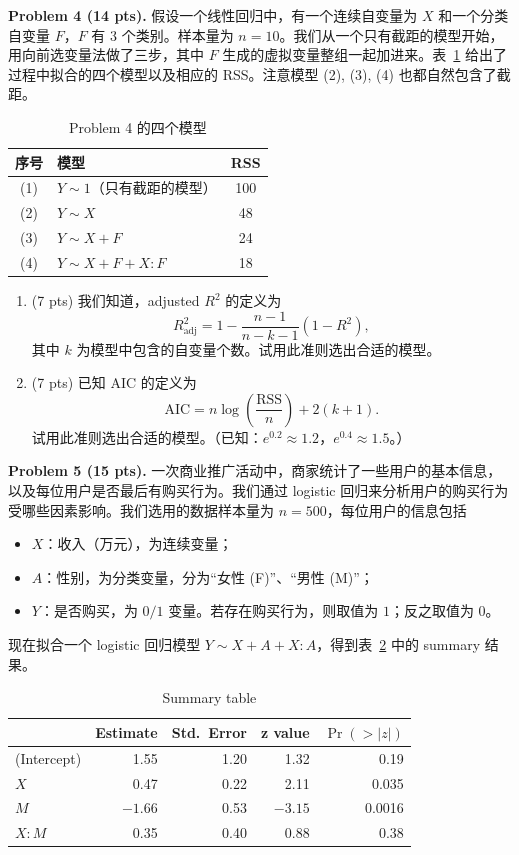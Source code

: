 \documentclass[11pt]{ctexart}
\begin{document}
\noindent\textbf{Problem 4 (14 pts).} 假设一个线性回归中，有一个连续自变量为 $X$ 和一个分类自变量 $F$，$F$ 有 $3$ 个类别。样本量为 $n = 10$。我们从一个只有截距的模型开始，用向前选变量法做了三步，其中 $F$ 生成的虚拟变量整组一起加进来。表~\ref{tab:mt1p4} 给出了过程中拟合的四个模型以及相应的 RSS。注意模型 (2), (3), (4) 也都自然包含了截距。

\begin{table}[h]
\centering
\caption{Problem 4 的四个模型}
\label{tab:mt1p4}
\begin{tabular}{clc}
\toprule
序号 & 模型 & RSS \\
\midrule
(1) & $Y \sim 1$（只有截距的模型） & 100 \\
(2) & $Y \sim X$ & 48 \\
(3) & $Y \sim X + F$ & 24 \\
(4) & $Y \sim X + F + X : F$ & 18 \\
\bottomrule
\end{tabular}
\end{table}

\begin{enumerate}
\item (7 pts) 我们知道，adjusted $R^2$ 的定义为
\[
R^2_{\mathrm{adj}} = 1 - \frac{n-1}{n-k-1}\left(1 - R^2\right),
\]
其中 $k$ 为模型中包含的自变量个数。试用此准则选出合适的模型。
\item (7 pts) 已知 AIC 的定义为
\[
\mathrm{AIC} = n \log\left(\frac{\mathrm{RSS}}{n}\right) + 2(k+1).
\]
试用此准则选出合适的模型。（已知：$e^{0.2} \approx 1.2$，$e^{0.4} \approx 1.5$。）
\end{enumerate}

\noindent\textbf{Problem 5 (15 pts).} 一次商业推广活动中，商家统计了一些用户的基本信息，以及每位用户是否最后有购买行为。我们通过 logistic 回归来分析用户的购买行为受哪些因素影响。我们选用的数据样本量为 $n = 500$，每位用户的信息包括
\begin{itemize}
\item $X$：收入（万元），为连续变量；
\item $A$：性别，为分类变量，分为“女性 (F)”、“男性 (M)”；
\item $Y$：是否购买，为 $0/1$ 变量。若存在购买行为，则取值为 $1$；反之取值为 $0$。
\end{itemize}
现在拟合一个 logistic 回归模型 $Y \sim X + A + X : A$，得到表~\ref{tab:mt1p5} 中的 summary 结果。

\begin{table}[h]
\centering
\caption{Summary table}
\label{tab:mt1p5}
\begin{tabular}{lrrrr}
\toprule
 & Estimate & Std.\ Error & z value & $\Pr(>|z|)$ \\
\midrule
(Intercept) & 1.55 & 1.20 & 1.32 & 0.19 \\
$X$ & 0.47 & 0.22 & 2.11 & 0.035 \\
$M$ & $-1.66$ & 0.53 & $-3.15$ & 0.0016 \\
$X : M$ & 0.35 & 0.40 & 0.88 & 0.38 \\
\bottomrule
\end{tabular}
\end{table}
\end{document}
